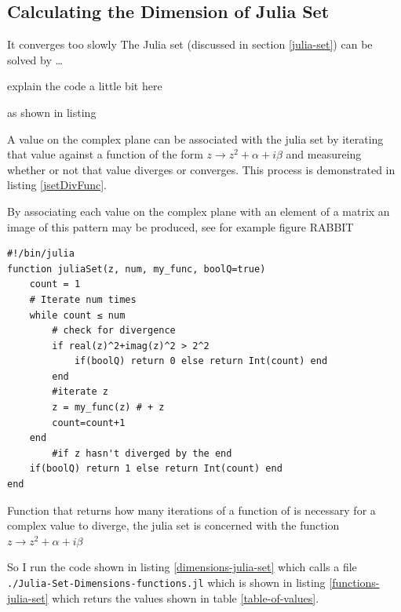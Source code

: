 \documentclass[11pt]{article}
\begin{document}
\subsection{Calculating the Dimension of Julia Set}
\label{sec:org0c21736}
It converges too slowly
The Julia set (discussed in section \ref{julia-set}) can be solved by \ldots{}

explain the code a little bit here

as shown in listing

A value on the complex plane can be associated with the julia set by iterating
that value against a function of the form \(z \rightarrow z^{2} + \alpha + i
\beta\) and measureing whether or not that value diverges or converges. This process is demonstrated in listing \ref{jsetDivFunc}.

By associating each value on the complex plane with an element of a matrix an image of this pattern may be produced, see for example figure RABBIT

\begin{listing}[htbp]
\begin{verbatim}
#!/bin/julia
function juliaSet(z, num, my_func, boolQ=true)
    count = 1
    # Iterate num times
    while count ≤ num
        # check for divergence
        if real(z)^2+imag(z)^2 > 2^2
            if(boolQ) return 0 else return Int(count) end
        end
        #iterate z
        z = my_func(z) # + z
        count=count+1
    end
        #if z hasn't diverged by the end
    if(boolQ) return 1 else return Int(count) end
end
\end{verbatim}
\caption{\label{jsetDivFunc}Function that returns how many iterations of a function of is necessary for a complex value to diverge, the julia set is concerned with the function \(z \rightarrow z^{2} + \alpha + i \beta\)}
\end{listing}


So I run the code shown in listing \ref{dimensions-julia-set} which calls a file \texttt{./Julia-Set-Dimensions-functions.jl} which is shown in listing \ref{functions-julia-set} which returs the values shown in table \ref{table-of-values}.
\end{document}
